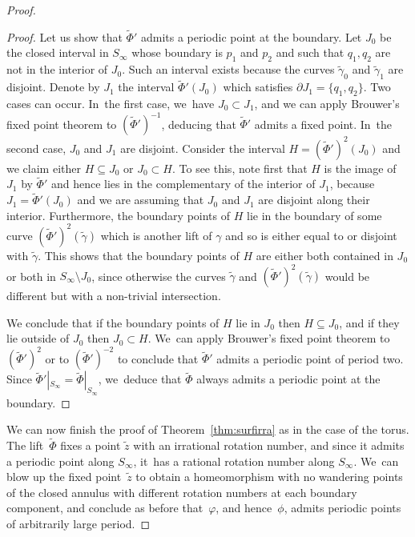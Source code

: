 \documentclass[JEP,XML,SOM,Unicode,NoEqCountersInSection,NoFloatCountersInSection,published]{cedram}
\theoremstyle{definition}
\begin{document}
\begin{proof}
\begin{proof}
Let us show that $\widetilde \Phi'$ admits a periodic point at the boundary. Let $J_0$ be the closed interval in $S_\infty$ whose boundary is $p_1$ and $p_2$ and such that $q_1,q_2$ are not in the interior of $J_0$. Such an interval exists because the curves $\widetilde \gamma_0$ and $\widetilde \gamma_1$ are disjoint. Denote by $J_1$ the interval $\widetilde \Phi'(J_0)$ which satisfies $\partial J_1=\{q_1,q_2\}$. Two cases can occur. In~the first case, we~have $J_0\subset J_1$, and we can apply Brouwer's fixed point theorem to $(\widetilde \Phi')^{-1}$, deducing that $\widetilde \Phi'$ admits a fixed point. In~the second case, $J_0$ and $J_1$ are disjoint. Consider the interval $H=(\widetilde \Phi')^2(J_0)$ and we claim either $H\subseteq J_0$ or $J_0\subset H$. To see this, note first that $H$ is the image of $J_1$ by $\widetilde \Phi'$ and hence lies in the complementary of the interior of $J_1$, because $J_1=\widetilde \Phi'(J_0)$ and we are assuming that $J_0$ and $J_1$ are disjoint along their interior. Furthermore, the boundary points of $H$ lie in the boundary of some curve $(\widetilde \Phi')^2(\widetilde \gamma)$ which is another lift of $\gamma$ and so is either equal to or disjoint with $\widetilde \gamma$. This shows that the boundary points of $H$ are either both contained in $J_0$ or both in $S_\infty\setminus J_0$, since otherwise the curves $\widetilde \gamma$ and $(\widetilde \Phi')^2(\widetilde \gamma)$ would be different but with a non-trivial intersection.

We conclude that if the boundary points of $H$ lie in $J_0$ then $H\subseteq J_0$, and if they lie outside of $J_0$ then $J_0\subset H$. We~can apply Brouwer's fixed point theorem to $(\widetilde \Phi')^2$ or to $(\widetilde \Phi')^{-2}$ to conclude that $\widetilde \Phi'$ admits a periodic point of period two. Since $\widetilde \Phi'|_{S_\infty}=\widetilde \Phi|_{S_\infty}$, we~deduce that $\widetilde\Phi $ always admits a periodic point at the boundary.
\end{proof}

We can now finish the proof of Theorem~\ref{thm:surfirra} as in the case of the torus. The lift~$\widetilde \Phi$ fixes a point $\widetilde z$ with an irrational rotation number, and since it admits a periodic point along $S_{\infty}$, it~has a rational rotation number along $S_\infty$. We~can blow up the fixed point~$\widetilde{z}$ to obtain a homeomorphism with no wandering points of the closed annulus with different rotation numbers at each boundary component, and conclude as before that~$\varphi$, and hence~$\phi$, admits periodic points of arbitrarily large period.
\end{proof}
\end{document}
